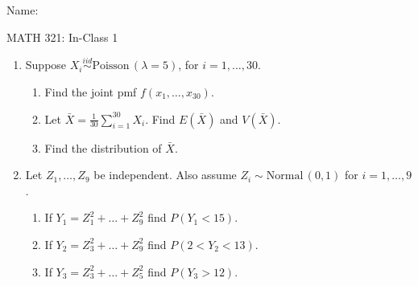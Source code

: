 \documentclass{article}
\newcommand{\vecn}[2]{#1_1, \ldots, #1_{#2}}	%
\newcommand{\follow}[1]{\sim \text{#1}\,}		%
\newcommand{\followsp}[2]{\overset{#1}\sim \text{#2}\,}		%
\begin{document}
\hspace{375pt}Name:

\begin{center}
{\Huge MATH 321: In-Class 1}
\end{center}

\bigskip\bigskip


\begin{enumerate}
   
   \item Suppose $X_i \followsp{iid}{Poisson}(\lambda = 5)$, for $i = 1, \ldots, 30$.%
    \begin{enumerate}
        \item Find the joint pmf $f(\vecn{x}{30})$.\vspace{80pt}
        \item Let $\displaystyle \bar{X} = \frac{1}{30} \sum_{i = 1}^{30} X_i$. Find $E(\bar{X})$ and $V(\bar{X})$.\vspace{60pt}
        \item Find the distribution of $\bar{X}$.\vspace{60pt}
    \end{enumerate}\bigskip

    \item Let $\vecn{Z}{9}$ be independent. Also assume $Z_i \follow{Normal}(0,1)$ for $i = 1, \ldots, 9$.%
    \begin{enumerate}
        \item If $Y_1 = Z_1^2 + \ldots +Z_9^2$ find $P(Y_1 < 15)$.\vspace{40pt}
        \item If $Y_2 = Z_3^2 + \ldots +Z_9^2$ find $P(2 < Y_2 < 13)$.\vspace{40pt}
        \item If $Y_3 = Z_3^2 + \ldots +Z_5^2$ find $P(Y_3 > 12)$.\vspace{40pt}
    \end{enumerate}
    

\end{enumerate}
\end{document}
